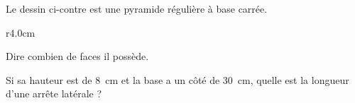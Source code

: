 
\begin{exercice}\label{exo2smath-0180}


Le dessin ci-contre est une pyramide régulière à base carrée.

\begin{wrapfigure}{r}{4.0cm}
   \vspace{-0.8cm}        %
   \centering
   
\end{wrapfigure}

Dire combien de faces il possède.

Si sa hauteur est de \SI{8}{\centi\meter} et la base a un côté de \SI{30}{\centi\meter}, quelle est la longueur d'une arrête latérale ?

\end{exercice}
